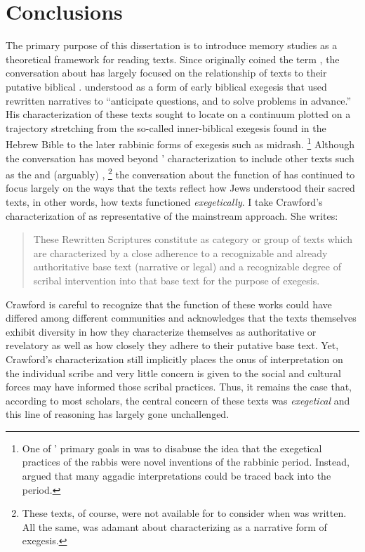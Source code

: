 
\chapter*{Conclusions}


The primary purpose of this dissertation is to introduce memory studies as a theoretical framework for reading \rwb texts. Since \Vermes originally coined the term \rwb, the conversation about \rwb has largely focused on the relationship of \rwb texts to their putative biblical \vorlagen. \vermes understood \rwb as a form of early biblical exegesis that used rewritten narratives to ``anticipate questions, and to solve problems in advance.''%
    \autocite[95]{vermes1961}
His characterization of these texts sought to locate \rwb on a continuum plotted on a trajectory stretching from the so-called inner-biblical exegesis found in the Hebrew Bible to the later rabbinic forms of exegesis such as midrash.%
    \footnote{One of \vermes' primary goals in  was to disabuse the idea that the exegetical practices of the rabbis were novel inventions of the rabbinic period. Instead, \vermes argued that many aggadic interpretations could be traced back into the \secondtemple period.}
Although the conversation has moved beyond \vermes' characterization to include other texts such as the \templescroll and (arguably) ,%
    \footnote{These texts, of course, were not available for \vermes to consider when  was written. All the same, \vermes was adamant about characterizing \rwb as a narrative form of exegesis.}    
the conversation about the function of \rwb has continued to focus largely on the ways that the \rwb texts reflect how \secondtemple Jews understood their sacred texts, in other words, how \rwb texts functioned \emph{exegetically}. I take Crawford's characterization of \rwb as representative of the mainstream approach. She writes:
\begin{quote}
    These Rewritten Scriptures constitute as category or group of texts which are characterized by a close adherence to a recognizable and already authoritative base text (narrative or legal) and a recognizable degree of scribal intervention into that base text for the purpose of exegesis.\autocite[12--13]{crawford2008}
\end{quote}
\noindent
Crawford is careful to recognize that the function of these works could have differed among different communities and acknowledges that the texts themselves exhibit diversity in how they characterize themselves as authoritative or revelatory as well as how closely they adhere to their putative base text.%
    \autocite[13]{crawford2008}
Yet, Crawford's characterization still implicitly places the onus of interpretation on the individual scribe and very little concern is given to the social and cultural forces may have informed those scribal practices. Thus, it remains the case that, according to most scholars, the central concern of these texts was \emph{exegetical} and this line of reasoning has largely gone unchallenged. 

